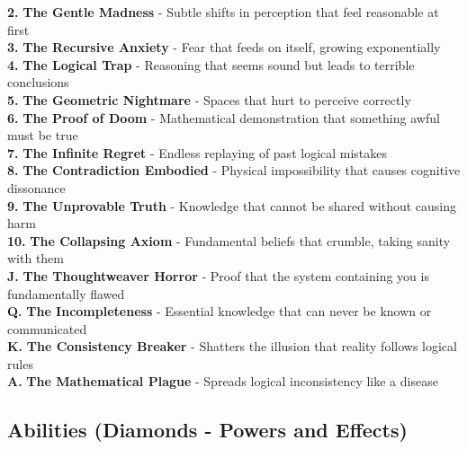 \documentclass[11pt]{article}
\begin{document}
\textbf{2.} \textbf{The Gentle Madness} - Subtle shifts in perception that feel reasonable at first \\
\textbf{3.} \textbf{The Recursive Anxiety} - Fear that feeds on itself, growing exponentially \\
\textbf{4.} \textbf{The Logical Trap} - Reasoning that seems sound but leads to terrible conclusions \\
\textbf{5.} \textbf{The Geometric Nightmare} - Spaces that hurt to perceive correctly \\
\textbf{6.} \textbf{The Proof of Doom} - Mathematical demonstration that something awful must be true \\
\textbf{7.} \textbf{The Infinite Regret} - Endless replaying of past logical mistakes \\
\textbf{8.} \textbf{The Contradiction Embodied} - Physical impossibility that causes cognitive dissonance \\
\textbf{9.} \textbf{The Unprovable Truth} - Knowledge that cannot be shared without causing harm \\
\textbf{10.} \textbf{The Collapsing Axiom} - Fundamental beliefs that crumble, taking sanity with them \\
\textbf{J.} \textbf{The Thoughtweaver Horror} - Proof that the system containing you is fundamentally flawed \\
\textbf{Q.} \textbf{The Incompleteness} - Essential knowledge that can never be known or communicated \\
\textbf{K.} \textbf{The Consistency Breaker} - Shatters the illusion that reality follows logical rules \\
\textbf{A.} \textbf{The Mathematical Plague} - Spreads logical inconsistency like a disease

\subsection*{Abilities (Diamonds - Powers and Effects)}
\end{document}
